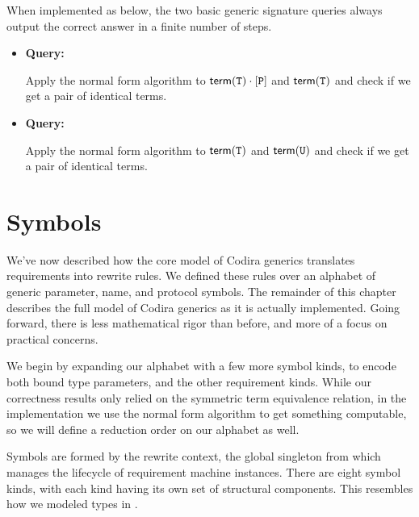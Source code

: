 \documentclass[../generics]{subfiles}
\begin{document}
\begin{mdframed}[leftline=false,rightline=false,linecolor=black,linewidth=2pt]
When implemented as below, the two basic generic signature queries always output the correct answer in a finite number of steps.
\begin{itemize}
\item \textbf{Query:} 

Apply the normal form algorithm to $\mathsf{term}(\texttt{T})\cdot[\texttt{P}]$ and $\mathsf{term}(\texttt{T})$ and check if we get a pair of identical terms.

\item \textbf{Query:} 

Apply the normal form algorithm to $\mathsf{term}(\texttt{T})$ and $\mathsf{term}(\texttt{U})$ and check if we get a pair of identical terms.
\end{itemize}
\end{mdframed}

\section{Symbols}\label{rqm symbols}

We've now described how the core model of Codira generics translates requirements into rewrite rules. We defined these rules over an alphabet of generic parameter, name, and protocol symbols. The remainder of this chapter describes the full model of Codira generics as it is actually implemented. Going forward, there is less mathematical rigor than before, and more of a focus on practical concerns.

We begin by expanding our alphabet with a few more symbol kinds, to encode both bound type parameters, and the other requirement kinds. While our correctness results only relied on the symmetric term equivalence relation, in the implementation we use the normal form algorithm to get something computable, so we will define a reduction order on our alphabet as well.

Symbols are formed by the rewrite context, the global singleton from  which manages the lifecycle of requirement machine instances. There are eight symbol kinds, with each kind having its own set of structural components. This resembles how we modeled types in .
\end{document}
